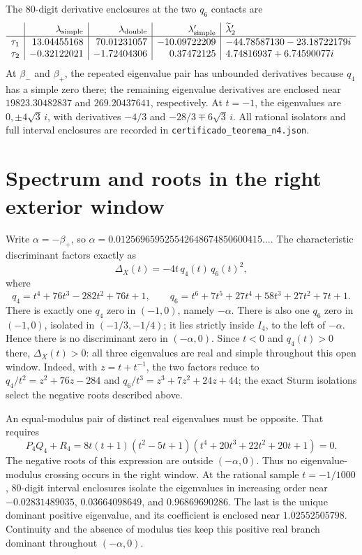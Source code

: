 \documentclass[11pt]{article}
\begin{document}
The 80-digit derivative enclosures at the two $q_6$ contacts are
\[
\begin{array}{c|r|r|r|l}
 &\lambda_{\rm simple}&\lambda_{\rm double}
 &\lambda_{\rm simple}'&\widetilde\lambda_2'\\ \hline
 \tau_1&
 13.04455168&70.01231057&-10.09722209&
 -44.78587130-23.18722179i\\
 \tau_2&
 -0.32122021&-1.72404306&0.37472125&
 4.74816937+6.74590077i
\end{array}
\]
At $\beta_-$ and $\beta_+$, the repeated eigenvalue pair has unbounded
derivatives because $q_4$ has a simple zero there; the remaining
eigenvalue derivatives are enclosed near $19823.30482837$ and
$269.20437641$, respectively. At $t=-1$, the eigenvalues are
$0,\pm4\sqrt3\,i$, with derivatives $-4/3$ and
$-28/3\mp6\sqrt3\,i$. All rational isolators and full interval
enclosures are recorded in
\texttt{certificado\_teorema\_n4.json}.

\section{Spectrum and roots in the right exterior window}
Write $\alpha=-\beta_+$, so
$\alpha=0.012569659525542648674850600415\ldots$. The characteristic
discriminant factors exactly as
\[
 \Delta_X(t)=-4t\,q_4(t)\,q_6(t)^2,
\]
where
\[
q_4=t^4+76t^3-282t^2+76t+1,\qquad
q_6=t^6+7t^5+27t^4+58t^3+27t^2+7t+1.
\]
There is exactly one $q_4$ zero in $(-1,0)$, namely $-\alpha$.
There is also one $q_6$ zero in $(-1,0)$, isolated in
$(-1/3,-1/4)$; it lies strictly inside $I_4$, to the left of
$-\alpha$. Hence there is no discriminant zero in $(-\alpha,0)$.
Since $t<0$ and $q_4(t)>0$ there, $\Delta_X(t)>0$: all three
eigenvalues are real and simple throughout this open window.
Indeed, with $z=t+t^{-1}$, the two factors reduce to
$q_4/t^2=z^2+76z-284$ and
$q_6/t^3=z^3+7z^2+24z+44$; the exact Sturm isolations select the
negative roots described above.

An equal-modulus pair of distinct real eigenvalues must be opposite.
That requires
\[
 P_4Q_4+R_4=
 8t(t+1)(t^2-5t+1)(t^4+20t^3+22t^2+20t+1)=0.
\]
The negative roots of this expression are outside $(-\alpha,0)$.
Thus no eigenvalue-modulus crossing occurs in the right window. At the
rational sample $t=-1/1000$, 80-digit interval enclosures isolate the
eigenvalues in increasing order near
$-0.02831489035$, $0.03664098649$, and $0.96869690286$.
The last is the unique dominant positive eigenvalue, and its coefficient
is enclosed near $1.02552505798$. Continuity and the absence of modulus
ties keep this positive real branch dominant throughout $(-\alpha,0)$.
\end{document}
